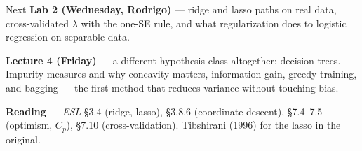 \documentclass[11pt,aspectratio=169]{beamer}
\begin{document}
\begin{frame}{Next}
\textbf{Lab 2 (Wednesday, Rodrigo)} --- ridge and lasso paths on real data, cross-validated $\lambda$ with the
one-SE rule, and what regularization does to logistic regression on separable data.
\vspace{8pt}

\textbf{Lecture 4 (Friday)} --- a different hypothesis class altogether: decision trees. Impurity measures
and why concavity matters, information gain, greedy training, and bagging --- the first method that reduces
variance without touching bias.
\vspace{8pt}

\textbf{Reading} --- \emph{ESL} \S3.4 (ridge, lasso), \S3.8.6 (coordinate descent), \S7.4--7.5 (optimism, $C_p$),
\S7.10 (cross-validation). Tibshirani (1996) for the lasso in the original.
\end{frame}
\end{document}
